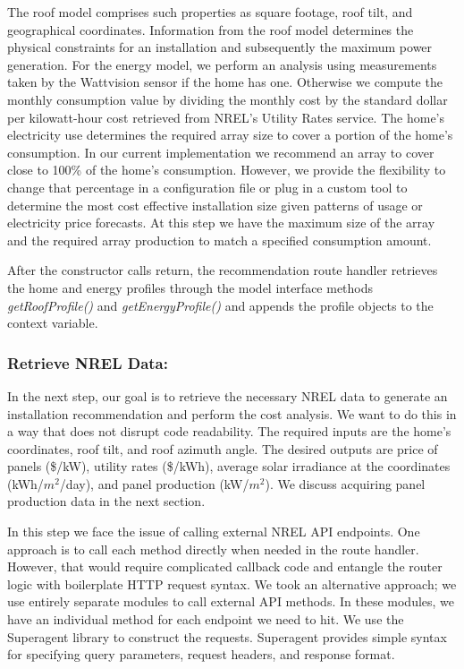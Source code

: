 \documentclass[pageno]{jpaper}
\begin{document}
The roof model comprises such properties as square footage, roof tilt, and geographical coordinates. Information from the roof model determines the physical constraints for an installation and subsequently the maximum power generation. For the energy model, we perform an analysis using measurements taken by the Wattvision sensor if the home has one. Otherwise we compute the monthly consumption value by dividing the monthly cost by the standard dollar per kilowatt-hour cost retrieved from NREL's Utility Rates service. The home's electricity use determines the required array size to cover a portion of the home's consumption. In our current implementation we recommend an array to cover close to 100\% of the home's consumption. However, we provide the flexibility to change that percentage in a configuration file or plug in a custom tool to determine the most cost effective installation size given patterns of usage or electricity price forecasts. At this step we have the maximum size of the array and the required array production to match a specified consumption amount. 

After the constructor calls return, the recommendation route handler retrieves the home and energy profiles through the model interface methods {\em getRoofProfile()} and {\em getEnergyProfile()} and appends the profile objects to the context variable.

\bigskip

\subsubsection{Retrieve NREL Data:}
In the next step, our goal is to retrieve the necessary NREL data to generate an installation recommendation and perform the cost analysis. We want to do this in a way that does not disrupt code readability. The required inputs are the home's coordinates, roof tilt, and roof azimuth angle. The desired outputs are price of panels (\$/kW), utility rates (\$/kWh), average solar irradiance at the coordinates (kWh/$m^2$/day), and panel production (kW/$m^2$). We discuss acquiring panel production data in the next section.

In this step we face the issue of calling external NREL API endpoints. One approach is to call each method directly when needed in the route handler. However, that would require complicated callback code and entangle the router logic with boilerplate HTTP request syntax. We took an alternative approach; we use entirely separate modules to call external API methods. In these modules, we have an individual method for each endpoint we need to hit. We use the Superagent library to construct the requests. Superagent provides simple syntax for specifying query parameters, request headers, and response format.
\end{document}
